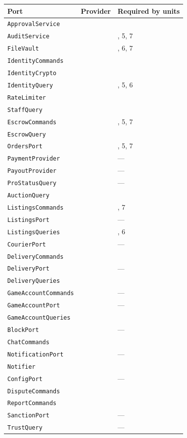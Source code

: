 \documentclass[11pt,a4paper]{article}
\newenvironment{dtable}[1]{\small\begin{longtable}{#1}}{\end{longtable}}
\begin{document}
\begin{dtable}{@{}>{\raggedright\arraybackslash}p{5.0cm}>{\centering\arraybackslash}p{2.0cm}>{\raggedright\arraybackslash}p{8.2cm}@{}}
\toprule
\textbf{Port} & \textbf{Provider} & \textbf{Required by units} \\ \midrule \endhead
\texttt{ApprovalService} & 1 & 7 \\
\texttt{AuditService} & 1 & 4, 5, 7 \\
\texttt{FileVault} & 1 & 5, 6, 7 \\
\texttt{IdentityCommands} & 1 & 7 \\
\texttt{IdentityCrypto} & 1 & 4 \\
\texttt{IdentityQuery} & 1 & 4, 5, 6 \\
\texttt{RateLimiter} & 1 & 4 \\
\texttt{StaffQuery} & 1 & 7 \\
\texttt{EscrowCommands} & 2 & 4, 5, 7 \\
\texttt{EscrowQuery} & 2 & 7 \\
\texttt{OrdersPort} & 2 & 4, 5, 7 \\
\texttt{PaymentProvider} & 2 & --- \\
\texttt{PayoutProvider} & 2 & --- \\
\texttt{ProStatusQuery} & 2 & --- \\
\texttt{AuctionQuery} & 3 & 6 \\
\texttt{ListingsCommands} & 3 & 5, 7 \\
\texttt{ListingsPort} & 3 & --- \\
\texttt{ListingsQueries} & 3 & 4, 6 \\
\texttt{CourierPort} & 4 & --- \\
\texttt{DeliveryCommands} & 4 & 7 \\
\texttt{DeliveryPort} & 4 & --- \\
\texttt{DeliveryQueries} & 4 & 7 \\
\texttt{GameAccountCommands} & 5 & --- \\
\texttt{GameAccountPort} & 5 & --- \\
\texttt{GameAccountQueries} & 5 & 7 \\
\texttt{BlockPort} & 6 & --- \\
\texttt{ChatCommands} & 6 & 7 \\
\texttt{NotificationPort} & 6 & --- \\
\texttt{Notifier} & 6 & 7 \\
\texttt{ConfigPort} & 7 & --- \\
\texttt{DisputeCommands} & 7 & 5 \\
\texttt{ReportCommands} & 7 & 6 \\
\texttt{SanctionPort} & 7 & --- \\
\texttt{TrustQuery} & 7 & --- \\
\bottomrule
\end{dtable}
\end{document}
